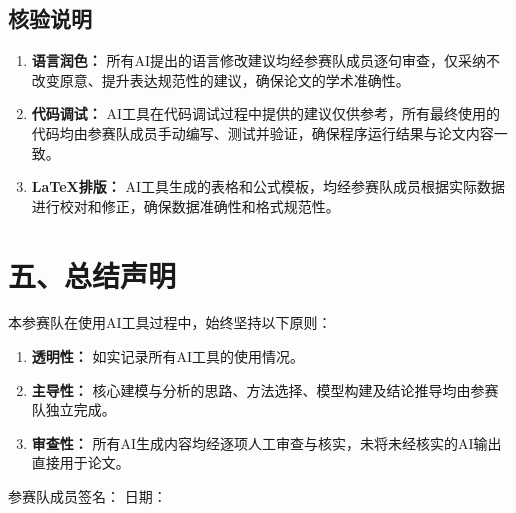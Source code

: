 \documentclass[a4paper,12pt]{article}
\begin{document}
	\subsection*{核验说明}
	
	\begin{enumerate}
		\item \textbf{语言润色：} 所有AI提出的语言修改建议均经参赛队成员逐句审查，仅采纳不改变原意、提升表达规范性的建议，确保论文的学术准确性。
		\item \textbf{代码调试：} AI工具在代码调试过程中提供的建议仅供参考，所有最终使用的代码均由参赛队成员手动编写、测试并验证，确保程序运行结果与论文内容一致。
		\item \textbf{LaTeX排版：} AI工具生成的表格和公式模板，均经参赛队成员根据实际数据进行校对和修正，确保数据准确性和格式规范性。
	\end{enumerate}
	
	\section*{五、总结声明}
	
	本参赛队在使用AI工具过程中，始终坚持以下原则：
	
	\begin{enumerate}
		\item \textbf{透明性：} 如实记录所有AI工具的使用情况。
		\item \textbf{主导性：} 核心建模与分析的思路、方法选择、模型构建及结论推导均由参赛队独立完成。
		\item \textbf{审查性：} 所有AI生成内容均经逐项人工审查与核实，未将未经核实的AI输出直接用于论文。
	\end{enumerate}
	
	\vspace{1cm}
	\noindent 参赛队成员签名：\hspace{3cm} 日期：\hspace{3cm}
	
\end{document}
